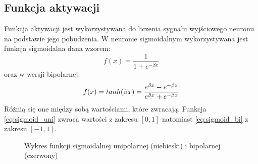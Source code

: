 \documentclass[a4paper,12pt]{article}
\numberwithin{equation}{section}
\begin{document}
\subsection{Funkcja aktywacji}
Funkcja aktywacji jest wykorzystywana do liczenia sygnału wyjściowego neuronu na podstawie jego pobudzenia. W neuronie sigmoidalnym wykorzystywana jest funkcja sigmoidalna dana wzorem:
\begin{equation} \label{eq:sigmoid_uni}
    f(x)=\frac{1}{1+e^{-\beta x}}
\end{equation}
oraz w wersji bipolarnej:
\begin{equation} \label{eq:sigmoid_bi}
    f(x)=tanh(\beta x)=\frac{e^{\beta x}-e^{-\beta x}}{e^{\beta x}+e^{-\beta x}}
    \vspace{0.3cm}
\end{equation}
Różnią się one między sobą wartościami, które zwracają. Funkcja \eqref{eq:sigmoid_uni} zwraca wartości z zakresu $[0,1]$ natomiast \eqref{eq:sigmoid_bi} z zakresu $[-1,1]$.

\begin{figure}[h]
    \vspace{0.5cm}
    \centering
    

    \caption{Wykres funkcji sigmoidalnej unipolarnej (niebieski) i bipolarnej (czerwony)}
    \label{fig:sigmoid}
    \vspace{0.5cm}
\end{figure}
\end{document}
